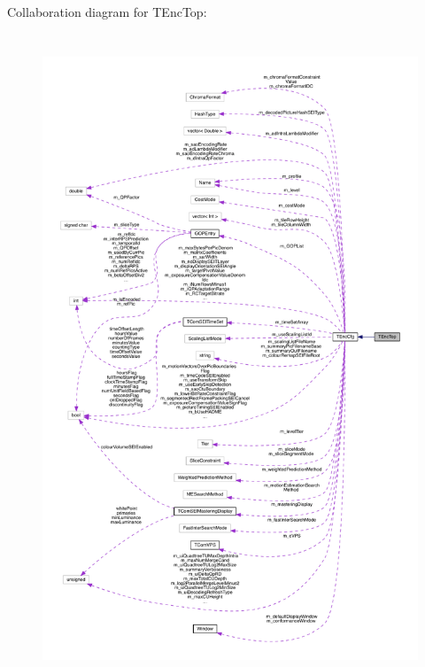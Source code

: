 Collaboration diagram for T\+Enc\+Top\+:
\nopagebreak
\begin{figure}[H]
\begin{center}
\leavevmode
\includegraphics[height=550pt]{d8/d2c/class_t_enc_top__coll__graph}
\end{center}
\end{figure}
